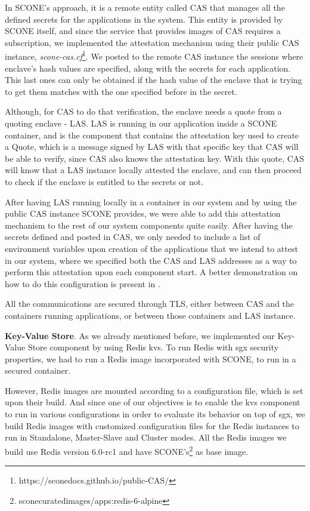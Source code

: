 In SCONE's approach, it is a remote entity called CAS that manages all the defined secrets for the applications in the system. This entity is provided by SCONE itself, and since the service that provides images of CAS requires a subscription, we implemented the attestation mechanism using their public CAS instance, \textit{scone-cas.cf}\footnote{https://sconedocs.github.io/public-CAS/}.
We posted to the remote CAS instance the sessions where enclave's hash values are specified, along with the secrets for each application. This last ones can only be obtained if the hash value of the enclave that is trying to get them matches with the one specified before in the secret. 

Although, for CAS to do that verification, the enclave needs a quote from a quoting enclave - LAS. LAS is running in our application inside a SCONE container, and is the component that contains the attestation key used to create a Quote, which is a message signed by LAS with that specific key that CAS will be able to verify, since CAS also knows the attestation key. With this quote, CAS will know that a LAS instance locally attested the enclave, and can then proceed to check if the enclave is entitled to the secrets or not.

After having LAS running locally in a container in our system and by using the public CAS instance SCONE provides, we were able to add this attestation mechanism to the rest of our system components quite easily. After having the secrets defined and posted in CAS, we only needed to include a list of environment variables upon creation of the applications that we intend to attest in our system, where we specified both the CAS and LAS addresses as a way to perform this attestation upon each component start. A better demonstration on how to do this configuration is present in \cite{sconeAttestationConfig}. 

All the communications are secured through TLS, either between CAS and the containers running applications, or between those containers and LAS instance. 


\vspace{3mm}
\textbf{Key-Value Store}. As we already mentioned before, we implemented our Key-Value Store component by using Redis \gls{kvs}. To run Redis with \gls{sgx} security properties, we had to run a Redis image incorporated with SCONE, to run in a secured container. 

However, Redis images are mounted according to a configuration file, which is set upon their build. 
And since one of our objectives is to enable the \gls{kvs} component to run in various configurations in order to evaluate its behavior on top of \gls{sgx}, we build Redis images with customized configuration files for the Redis instances to run in Standalone, Master-Slave and Cluster modes. All the Redis images we build use Redis version 6.0-rc1 and have SCONE's\footnote{sconecuratedimages/apps:redis-6-alpine} as base image. 

